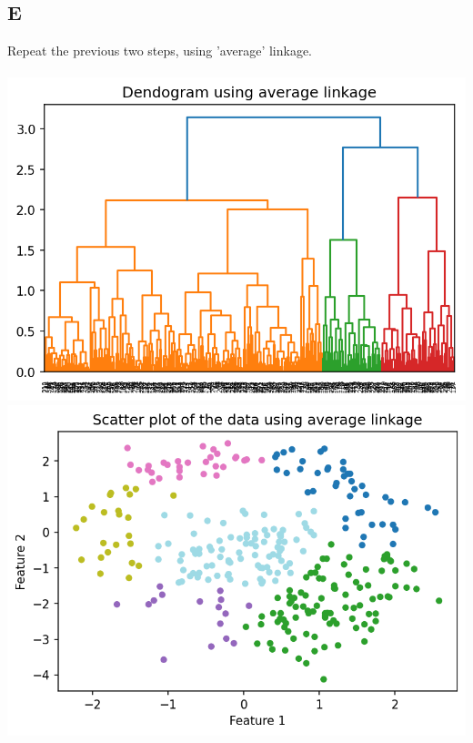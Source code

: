 \documentclass[12pt]{article}
\begin{document}
\subsection{E}
Repeat the previous two steps, using 'average' linkage.\\\\
\includegraphics[width=1\textwidth]{p2.e.1.png}
\includegraphics[width=1\textwidth]{p2.e.2.png}
\end{document}
